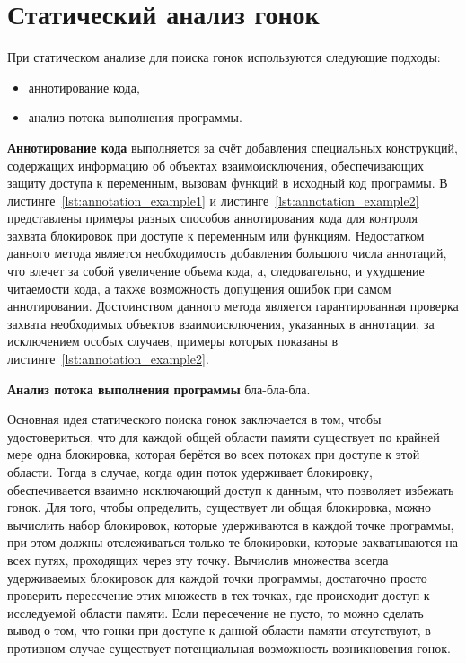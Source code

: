 \chapter{Статический анализ гонок}
\label{cha:static-methods}

При статическом анализе для поиска гонок используются следующие подходы:
\begin{itemize}
\item аннотирование кода,
\item анализ потока выполнения программы.
\end{itemize}

\textbf{Аннотирование кода} выполняется за счёт добавления специальных конструкций, содержащих информацию об объектах взаимоисключения, обеспечивающих защиту доступа к переменным, вызовам функций в исходный код программы. В листинге~\ref{lst:annotation_example1} и листинге~\ref{lst:annotation_example2} представлены примеры разных способов аннотирования кода для контроля захвата блокировок при доступе к переменным или функциям. Недостатком данного метода является необходимость добавления большого числа аннотаций, что влечет за собой увеличение объема кода, а, следовательно, и ухудшение читаемости кода, а также возможность допущения ошибок при самом аннотировании. Достоинством данного метода является гарантированная проверка захвата необходимых объектов взаимоисключения, указанных в аннотации, за исключением особых случаев, примеры которых показаны в листинге~\ref{lst:annotation_example2}.







\textbf{Анализ потока выполнения программы} бла-бла-бла.

Основная идея статического поиска гонок заключается в том, чтобы удостовериться, что для каждой общей области памяти существует по крайней мере одна блокировка, которая берётся во всех потоках при доступе к этой области. Тогда в случае, когда один поток удерживает блокировку, обеспечивается взаимно исключающий доступ к данным, что позволяет избежать гонок. Для того, чтобы определить, существует ли общая блокировка, можно вычислить набор блокировок, которые удерживаются в каждой точке программы, при этом должны отслеживаться только те блокировки, которые захватываются на всех путях, проходящих через эту точку. Вычислив множества всегда удерживаемых блокировок для каждой точки программы, достаточно просто проверить пересечение этих множеств в тех точках, где происходит доступ к исследуемой области памяти. Если пересечение не пусто, то можно сделать вывод о том, что гонки при доступе к данной области памяти отсутствуют, в противном случае существует потенциальная возможность возникновения гонок.

